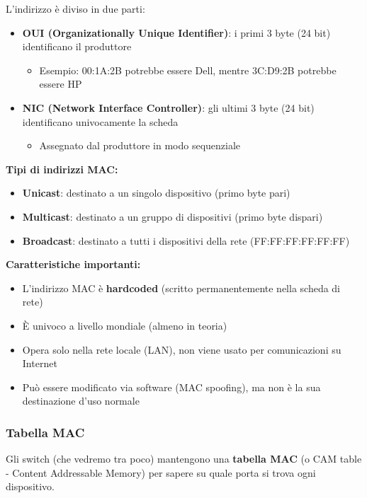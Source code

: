 \documentclass[12pt,a4paper]{article}
\begin{document}
L'indirizzo è diviso in due parti:
\begin{itemize}
    \item \textbf{OUI (Organizationally Unique Identifier)}: i primi 3 byte (24 bit) identificano il produttore
    \begin{itemize}
        \item Esempio: 00:1A:2B potrebbe essere Dell, mentre 3C:D9:2B potrebbe essere HP
    \end{itemize}
    \item \textbf{NIC (Network Interface Controller)}: gli ultimi 3 byte (24 bit) identificano univocamente la scheda
    \begin{itemize}
        \item Assegnato dal produttore in modo sequenziale
    \end{itemize}
\end{itemize}

\textbf{Tipi di indirizzi MAC:}
\begin{itemize}
    \item \textbf{Unicast}: destinato a un singolo dispositivo (primo byte pari)
    \item \textbf{Multicast}: destinato a un gruppo di dispositivi (primo byte dispari)
    \item \textbf{Broadcast}: destinato a tutti i dispositivi della rete (FF:FF:FF:FF:FF:FF)
\end{itemize}

\textbf{Caratteristiche importanti:}
\begin{itemize}
    \item L'indirizzo MAC è \textbf{hardcoded} (scritto permanentemente nella scheda di rete)
    \item È univoco a livello mondiale (almeno in teoria)
    \item Opera solo nella rete locale (LAN), non viene usato per comunicazioni su Internet
    \item Può essere modificato via software (MAC spoofing), ma non è la sua destinazione d'uso normale
\end{itemize}

\subsubsection{Tabella MAC}

Gli switch (che vedremo tra poco) mantengono una \textbf{tabella MAC} (o CAM table - Content Addressable Memory) per sapere su quale porta si trova ogni dispositivo.
\end{document}
